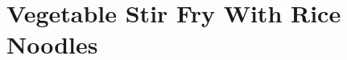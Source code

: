 \thispagestyle{fancy}
\section{Vegetable Stir Fry With Rice Noodles}
\AddToShipoutPicture*{\StirFryRiceNoodles}
